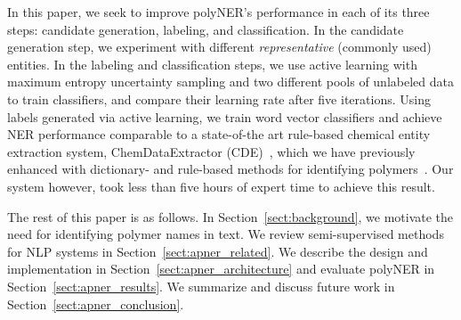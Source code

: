 In this paper, we seek to improve polyNER's performance in each of its three steps:
candidate generation, 
labeling, and classification.
In the candidate generation step,
we experiment with different \textit{representative} (commonly used) entities. %
In the labeling and classification steps,
we use active learning with maximum entropy uncertainty sampling and two different pools of unlabeled data to train classifiers, and compare their learning rate after five iterations. 
Using labels generated via active learning, we train word vector classifiers and achieve NER performance comparable to 
a state-of-the art rule-based chemical entity extraction
system, ChemDataExtractor (CDE)~\cite{swain2016chemdataextractor}, 
which we have previously enhanced
with dictionary- and rule-based methods for identifying polymers~\cite{tchoua2017towards}.
Our system however, took less than five hours of expert time to achieve this result.

The rest of this paper is as follows. 
In Section~\ref{sect:background}, we motivate the need for identifying polymer names in
text. 
We review semi-supervised methods for NLP systems in
Section~\ref{sect:apner_related}. 
We describe the design and implementation in Section~\ref{sect:apner_architecture} and evaluate polyNER
in Section~\ref{sect:apner_results}. We summarize and discuss future work in Section~\ref{sect:apner_conclusion}.
